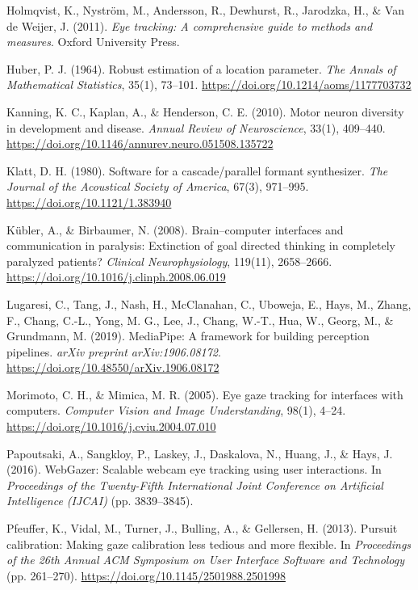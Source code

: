 \documentclass[twocolumn,10pt]{article}
\begin{document}
\begin{description}
    \item Holmqvist, K., Nystr{\"o}m, M., Andersson, R., Dewhurst, R., Jarodzka, H., \& Van de Weijer, J. (2011). \textit{Eye tracking: A comprehensive guide to methods and measures}. Oxford University Press.
    \item Huber, P. J. (1964). Robust estimation of a location parameter. \textit{The Annals of Mathematical Statistics}, 35(1), 73--101. \url{https://doi.org/10.1214/aoms/1177703732}
    \item Kanning, K. C., Kaplan, A., \& Henderson, C. E. (2010). Motor neuron diversity in development and disease. \textit{Annual Review of Neuroscience}, 33(1), 409--440. \url{https://doi.org/10.1146/annurev.neuro.051508.135722}
    \item Klatt, D. H. (1980). Software for a cascade/parallel formant synthesizer. \textit{The Journal of the Acoustical Society of America}, 67(3), 971--995. \url{https://doi.org/10.1121/1.383940}
    \item K{\"u}bler, A., \& Birbaumer, N. (2008). Brain--computer interfaces and communication in paralysis: Extinction of goal directed thinking in completely paralyzed patients? \textit{Clinical Neurophysiology}, 119(11), 2658--2666. \url{https://doi.org/10.1016/j.clinph.2008.06.019}
    \item Lugaresi, C., Tang, J., Nash, H., McClanahan, C., Uboweja, E., Hays, M., Zhang, F., Chang, C.-L., Yong, M. G., Lee, J., Chang, W.-T., Hua, W., Georg, M., \& Grundmann, M. (2019). MediaPipe: A framework for building perception pipelines. \textit{arXiv preprint arXiv:1906.08172}. \url{https://doi.org/10.48550/arXiv.1906.08172}
    \item Morimoto, C. H., \& Mimica, M. R. (2005). Eye gaze tracking for interfaces with computers. \textit{Computer Vision and Image Understanding}, 98(1), 4--24. \url{https://doi.org/10.1016/j.cviu.2004.07.010}
    \item Papoutsaki, A., Sangkloy, P., Laskey, J., Daskalova, N., Huang, J., \& Hays, J. (2016). WebGazer: Scalable webcam eye tracking using user interactions. In \textit{Proceedings of the Twenty-Fifth International Joint Conference on Artificial Intelligence (IJCAI)} (pp. 3839--3845).
    \item Pfeuffer, K., Vidal, M., Turner, J., Bulling, A., \& Gellersen, H. (2013). Pursuit calibration: Making gaze calibration less tedious and more flexible. In \textit{Proceedings of the 26th Annual ACM Symposium on User Interface Software and Technology} (pp. 261--270). \url{https://doi.org/10.1145/2501988.2501998}

\end{description}
\end{document}

